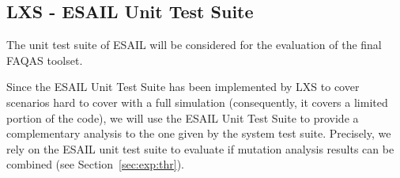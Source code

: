 \subsection{LXS - ESAIL Unit Test Suite}
\label{chapter:caseStudies:LXS:Unit}

The unit test suite of ESAIL will be considered for the evaluation of the final FAQAS toolset.


Since the ESAIL Unit Test Suite has been implemented by LXS to cover scenarios hard to cover with a full simulation (consequently, it covers a limited portion of the code), we will use the ESAIL Unit Test Suite to provide a complementary analysis to the one given by the system test suite.
Precisely, we rely on the ESAIL unit test suite to evaluate if mutation analysis results can be combined (see Section~\ref{sec:exp:thr}).






